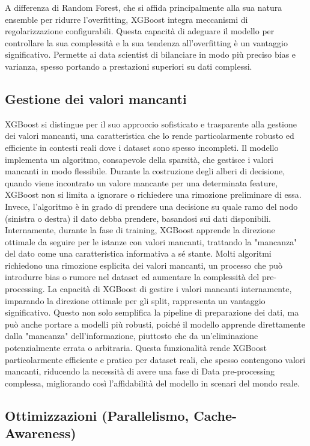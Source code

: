 \documentclass[a4paper,12pt]{report}
\begin{document}
	A differenza di Random Forest, che si affida principalmente alla sua natura ensemble per ridurre l'overfitting, XGBoost integra meccanismi di regolarizzazione configurabili. Questa capacità di adeguare il modello per controllare la sua complessità e la sua tendenza all'overfitting è un vantaggio significativo. Permette ai data scientist di bilanciare in modo più preciso bias e varianza, spesso portando a prestazioni superiori su dati complessi.
	
	\subsection{Gestione dei valori mancanti}
	
	XGBoost si distingue per il suo approccio sofisticato e trasparente alla gestione dei valori mancanti, una caratteristica che lo rende particolarmente robusto ed efficiente in contesti reali dove i dataset sono spesso incompleti.
	Il modello implementa un algoritmo, consapevole della sparsità, che gestisce i valori mancanti in modo flessibile. Durante la costruzione degli alberi di decisione, quando viene incontrato un valore mancante per una determinata feature, XGBoost non si limita a ignorare o richiedere una rimozione preliminare di essa. Invece, l'algoritmo è in grado di prendere una decisione su quale ramo del nodo (sinistra o destra) il dato debba prendere, basandosi sui dati disponibili. Internamente, durante la fase di training, XGBoost apprende la direzione ottimale da seguire per le istanze con valori mancanti, trattando la "mancanza" del dato come una caratteristica informativa a sé stante.
	Molti algoritmi richiedono una rimozione esplicita dei valori mancanti, un processo che può introdurre bias o rumore nel dataset ed aumentare la complessità del pre-processing. La capacità di XGBoost di gestire i valori mancanti internamente, imparando la direzione ottimale per gli split, rappresenta un vantaggio significativo. Questo non solo semplifica la pipeline di preparazione dei dati, ma può anche portare a modelli più robusti, poiché il modello apprende direttamente dalla "mancanza" dell'informazione, piuttosto che da un'eliminazione potenzialmente errata o arbitraria. Questa funzionalità rende XGBoost particolarmente efficiente e pratico per dataset reali, che spesso contengono valori mancanti, riducendo la necessità di avere una fase di Data pre-processing complessa, migliorando così l'affidabilità del modello in scenari del mondo reale.
	
	\subsection{Ottimizzazioni (Parallelismo, Cache-Awareness)}
	
\end{document}
